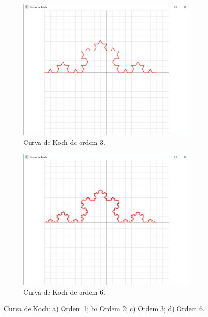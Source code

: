 \begin{renumerate}
\begin{enumerate}[label=(\alph*)]
\begin{figure}[H]
\begin{subfigure}[t]{0.3\textwidth}
              \centerline{\includegraphics[width=.9\textwidth]{img/cap4_ex14c}}
              \caption{Curva de Koch de ordem $3$.}
              \label{fig:cap03_ex14c}
          \end{subfigure}
          \hfill
          \begin{subfigure}[t]{0.3\textwidth}
              \centerline{\includegraphics[width=.9\textwidth]{img/cap4_ex14d}}
              \caption{Curva de Koch de ordem $6$.}
              \label{fig:cap03_ex14d}
          \end{subfigure}
          
          \caption{
            \label{fig:koch}%
            Curva de Koch: a) Ordem 1; b) Ordem 2; c) Ordem 3; d) Ordem 6.
          }

        \end{figure}


\end{enumerate}
\end{renumerate}

